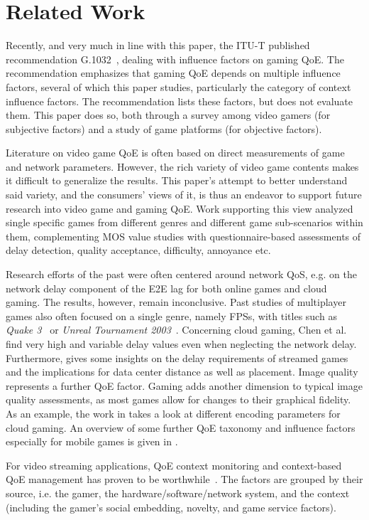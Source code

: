 \section{Related Work}
\label{sec:relatedwork}

Recently, and very much in line with this paper, the \acrshort{ITU-T}
published recommendation G.1032~\cite{mollertowards, itutg1032}, dealing with
influence factors on gaming \gls{QoE}.
The recommendation emphasizes that gaming \gls{QoE} depends on multiple
influence factors, several of which this paper studies,
particularly the category of context influence factors.
The recommendation lists these factors,
but does not evaluate them. This paper does so, both through a survey
among video gamers (for subjective factors) and a study of
game platforms (for objective factors).

Literature on video game \gls{QoE} is often based on
direct measurements of game and network parameters. However, the
rich variety of video game contents makes it difficult to generalize
the results. This paper's attempt to better understand said variety,
and the consumers' views of it, is thus an endeavor to support future
research into video game and gaming \gls{QoE}.
Work supporting this view \cite{7965676,7503835} analyzed single specific
games from different genres and different game sub-scenarios within
them, complementing \acrshort{MOS} value studies with questionnaire-based
assessments of delay detection, quality acceptance, difficulty,
annoyance etc.

Research efforts of the past were often centered around network \acrshort{QoS}, e.g. on the network delay component of the \gls{E2E} lag for both online games and cloud gaming. The results, however, remain inconclusive. Past studies of multiplayer games also often focused on a single genre, namely \glspl{FPS}, with titles such as \textit{Quake 3}~\cite{1266180} or \textit{Unreal Tournament 2003}~\cite{Beigbeder:2004:ELL:1016540.1016556}. Concerning cloud gaming, Chen et al.~\cite{6670099} find very high and variable delay values even when neglecting the network delay. Furthermore, \cite{Choy:2012:BSC:2501560.2501563} gives some insights on the delay requirements of streamed games and the implications for data center distance as well as placement.
Image quality represents a further \gls{QoE} factor. Gaming adds
another dimension to typical image quality assessments, as most
games allow for changes to their graphical fidelity.
As an example, the work in \cite{slivarimpact} takes a look at different encoding parameters for cloud gaming.
An overview of some further \gls{QoE} taxonomy and influence factors especially for mobile games is given in \cite{beyer2014typedisplaydelayimpact}.

For video streaming applications, \gls{QoE} context
monitoring and context-based \gls{QoE} management has proven to be
worthwhile~\cite{7140480}. The factors are grouped by
their source, i.e. the gamer, the hardware/software/network system,
and the context (including the gamer's social embedding, novelty,
and game service factors).
